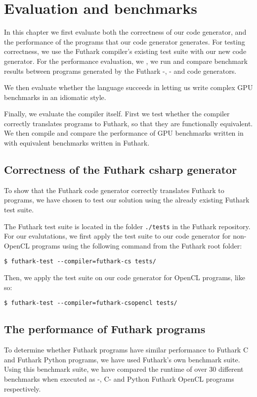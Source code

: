 \chapter{Evaluation and benchmarks}
In this chapter we first evaluate both the correctness of our code generator,
and the performance of the \csharp{} programs that our code generator generates.
For testing correctness, we use the Futhark compiler's existing test suite with
our new code generator. For the performance evaluation, we , we run and compare benchmark
results between programs generated by the Futhark \csharp{}-, \C{}- and \Python{} code generators.

We then evaluate whether the \fshark{} language succeeds in letting us write
complex GPU benchmarks in an idiomatic \fsharp{} style.

Finally, we evaluate the \fshark{} compiler itself. First we test whether the
\fshark{} compiler correctly translates \fshark{} programs to Futhark, so that
they are functionally equivalent.
We then compile and compare the performance of GPU benchmarks written in
\fshark{} with equivalent benchmarks written in Futhark.


\section{Correctness of the Futhark csharp{} generator}
\label{subsec:futharkcsharpcorrectness}
To show that the Futhark \csharp{} code generator correctly translates Futhark
to \csharp{} programs, we have chosen to test our solution using the already existing Futhark test
suite.

The Futhark test suite is located in the folder \texttt{./tests} in the Futhark
repository. For our evalutations, we first apply the test suite to our \csharp{}
code generator for non-OpenCL programs using the following command from the
Futhark root folder:

\begin{verbatim}
$ futhark-test --compiler=futhark-cs tests/
\end{verbatim}

Then, we apply the test suite on our code generator for \csharp{} OpenCL
programs, like so:

\begin{verbatim}
$ futhark-test --compiler=futhark-csopencl tests/
\end{verbatim}



\section{The performance of Futhark \csharp{} programs}
\label{subsec:futharkcsharpperformance}
To determine whether Futhark \csharp{} programs have similar performance to
Futhark C and Futhark Python programs, we have used Futhark's own benchmark
suite.
Using this benchmark suite, we have compared the runtime of over 30 different
benchmarks when executed as \csharp{}-, C- and Python Futhark OpenCL programs
respectively.

